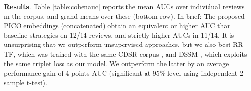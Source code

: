 \documentclass[11pt,a4paper]{article}
\begin{document}




\vspace{.15em}
\noindent \textbf{Results}. Table \ref{table:cohenauc} reports the mean AUCs over individual reviews in the  corpus, and grand means over these (bottom row). %
In brief: The proposed PICO embeddings (concatenated) obtain an equivalent or higher AUC than baseline strategies on 12/14 reviews, and strictly higher AUCs in 11/14. It is unsurprising that we outperform unsupervised approaches, but we also best RR-TF, which was trained with the same CDSR corpus \cite{wallace2016extracting}, and DSSM \cite{shen2014latent}, which exploits the same triplet loss as our model. We outperform the latter by an average performance gain of 4 points AUC (significant at 95\% level using independent 2-sample t-test).
\end{document}

